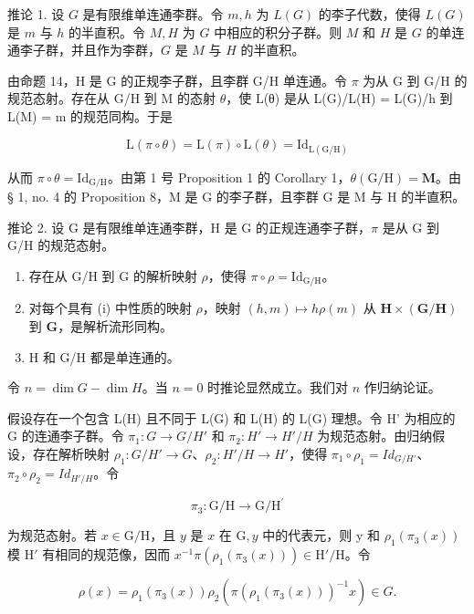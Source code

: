 推论 1. 设 \(G\) 是有限维单连通李群。令 \(m, h\) 为 \(L(G)\) 的李子代数，使得 \(L(G)\) 是 \(m\) 与 \(h\) 的半直积。令 \(M, H\) 为 \(G\) 中相应的积分子群。则 \(M\) 和 \(H\) 是 \(G\) 的单连通李子群，并且作为李群，\(G\) 是 \(M\) 与 \(H\) 的半直积。

由命题 14，H 是 G 的正规李子群，且李群 G/H 单连通。令 \(\pi\) 为从 G 到 G/H 的规范态射。存在从 G/H 到 M 的态射 \(\theta\)，使 L(θ) 是从 L(G)/L(H) = L(G)/h 到 L(M) = m 的规范同构。于是

\[
\mathrm{L} (\pi \circ \theta) = \mathrm{L} (\pi) \circ \mathrm{L} (\theta) = \mathrm{Id} _ {\mathrm{L} (\mathrm{G} / \mathrm{H})}
\]

从而 \(\pi \circ \theta = \mathrm{Id}_{\mathrm{G}/\mathrm{H}}\)。由第 1 号 Proposition 1 的 Corollary 1，\(\theta (\mathrm{G / H}) = \mathbf{M}\)。由 § 1, no. 4 的 Proposition 8，M 是 G 的李子群，且李群 G 是 M 与 H 的半直积。

推论 2. 设 G 是有限维单连通李群，H 是 G 的正规连通李子群，\(\pi\) 是从 G 到 G/H 的规范态射。

\begin{enumerate}
\def\labelenumi{(\roman{enumi})}
\item
  存在从 G/H 到 G 的解析映射 \(\rho\)，使得 \(\pi \circ \rho = \mathrm{Id}_{\mathrm{G / H}}\)。
\item
  对每个具有 (i) 中性质的映射 \(\rho\)，映射 \((h, m) \mapsto h\rho(m)\) 从 \(\mathbf{H} \times (\mathbf{G}/\mathbf{H})\) 到 \(\mathbf{G}\)，是解析流形同构。
\item
  H 和 G/H 都是单连通的。
\end{enumerate}

令 \(n = \dim G - \dim H\)。当 \(n = 0\) 时推论显然成立。我们对 \(n\) 作归纳论证。

假设存在一个包含 L(H) 且不同于 L(G) 和 L(H) 的 L(G) 理想。令 H' 为相应的 G 的连通李子群。令 \(\pi_{1}: G \to G/H'\) 和 \(\pi_{2}: H' \to H'/H\) 为规范态射。由归纳假设，存在解析映射 \(\rho_{1}: G/H' \to G\)、\(\rho_{2}: H'/H \to H'\)，使得 \(\pi_{1} \circ \rho_{1} = Id_{G/H'}\)、\(\pi_{2} \circ \rho_{2} = Id_{H'/H}\)。令

\[
\pi_ {3} \colon \mathrm{G} / \mathrm{H} \rightarrow \mathrm{G} / \mathrm{H} ^ {\prime}
\]

为规范态射。若 \(x \in \mathrm{G} / \mathrm{H}\)，且 \(y\) 是 \(x\) 在 \(\mathrm{G}, y\) 中的代表元，则 y 和 \(\rho_1(\pi_3(x))\) 模 \(\mathrm{H}'\) 有相同的规范像，因而 \(x^{-1}\pi (\rho_1(\pi_3(x))) \in \mathrm{H}' / \mathrm{H}\)。令

\[
\rho (x) = \rho_ {1} (\pi_ {3} (x)) \rho_ {2} (\pi (\rho_ {1} (\pi_ {3} (x))) ^ {- 1} x) \in G.
\]

